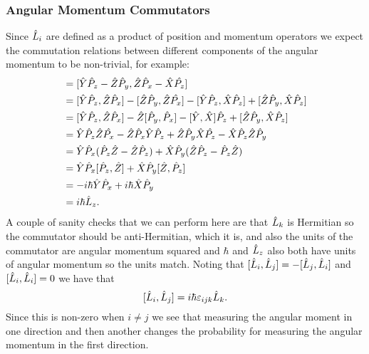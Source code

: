 \documentclass[a4paper]{article}
\theoremstyle{definition}
\begin{document}
    \subsubsection{Angular Momentum Commutators}
    Since \(\hat{L}_i\) are defined as a product of position and momentum operators we expect the commutation relations between different components of the angular momentum to be non-trivial, for example:
    \begin{align*}
        [\operator{L}_x, \operator{L}_y] &= [\operator{Y}\operator{P}_z - \operator{Z}\operator{P}_y, \operator{Z}\operator{P}_x - \operator{X}\operator{P_z}]\\
        &= [\operator{Y}\operator{P}_z, \operator{Z}\operator{P}_x] - [\operator{Z}\operator{P}_y, \operator{Z}\operator{P_x}] - [\operator{Y}\operator{P}_z, \operator{X}\operator{P}_z] + [\operator{Z}\operator{P}_y, \operator{X}\operator{P}_z]\\
        &= [\operator{Y}\operator{P}_z, \operator{Z}\operator{P}_x] - \operator{Z}[\operator{P}_y, \operator{P}_x] - [\operator{Y}, \operator{X}]\operator{P}_z + [\operator{Z}\operator{P}_y, \operator{X}\operator{P}_z]\\
        &= \operator{Y}\operator{P}_z\operator{Z}\operator{P_x} - \operator{Z}\operator{P}_x\operator{Y}\operator{P}_z + \operator{Z}\operator{P}_y\operator{X}\operator{P_z} - \operator{X}\operator{P}_z\operator{Z}\operator{P}_y\\
        &= \operator{Y}\operator{P}_x(\operator{P}_z\operator{Z} - \operator{Z}\operator{P}_z) + \operator{X}\operator{P}_y(\operator{Z}\operator{P}_z - \operator{P}_z\operator{Z})\\
        &= \operator{Y}\operator{P}_x[\operator{P}_z, \operator{Z}] + \operator{X}\operator{P}_y[\operator{Z}, \operator{P}_z]\\
        &= -i\hbar\operator{Y}\operator{P}_x + i\hbar\operator{X}\operator{P}_y\\
        &= i\hbar\operator{L}_z.
    \end{align*}
    A couple of sanity checks that we can perform here are that \(\hat{L}_k\) is Hermitian so the commutator should be anti-Hermitian, which it is, and also the units of the commutator are angular momentum squared and \(\hbar\) and \(\hat{L}_z\) also both have units of angular momentum so the units match.
    Noting that \([\hat{L}_i, \hat{L}_j] = -[\hat{L}_j, \hat{L}_i]\) and \([\hat{L}_i, \hat{L}_i] = 0\) we have that
    \[[\hat{L}_i, \hat{L}_j] = i\hbar\varepsilon_{ijk}\hat{L}_k.\]
    Since this is non-zero when \(i\ne j\) we see that measuring the angular moment in one direction and then another changes the probability for measuring the angular momentum in the first direction.
    
\end{document}
